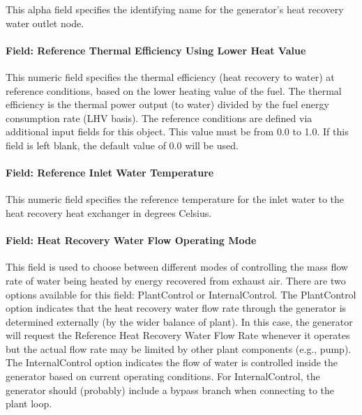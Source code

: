 This alpha field specifies the identifying name for the generator's heat recovery water outlet node.

\paragraph{Field: Reference Thermal Efficiency Using Lower Heat Value}\label{field-reference-thermal-efficiency-using-lower-heat-value}

This numeric field specifies the thermal efficiency (heat recovery to water) at reference conditions, based on the lower heating value of the fuel. The thermal efficiency is the thermal power output (to water) divided by the fuel energy consumption rate (LHV basis). The reference conditions are defined via additional input fields for this object. This value must be from 0.0 to 1.0. If this field is left blank, the default value of 0.0 will be used.

\paragraph{Field: Reference Inlet Water Temperature}\label{field-reference-inlet-water-temperature}

This numeric field specifies the reference temperature for the inlet water to the heat recovery heat exchanger in degrees Celsius.

\paragraph{Field: Heat Recovery Water Flow Operating Mode}\label{field-heat-recovery-water-flow-operating-mode}

This field is used to choose between different modes of controlling the mass flow rate of water being heated by energy recovered from exhaust air. There are two options available for this field: PlantControl or InternalControl. The PlantControl option indicates that the heat recovery water flow rate through the generator is determined externally (by the wider balance of plant). In this case, the generator will request the Reference Heat Recovery Water Flow Rate whenever it operates but the actual flow rate may be limited by other plant components (e.g., pump). The InternalControl option indicates the flow of water is controlled inside the generator based on current operating conditions. For InternalControl, the generator should (probably) include a bypass branch when connecting to the plant loop.

